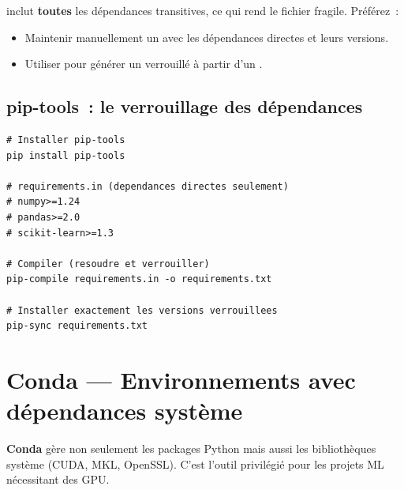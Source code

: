 \begin{attention}[title=\textbf{Pi\`eges de pip freeze}]
 inclut \textbf{toutes} les d\'ependances transitives, ce
qui rend le fichier fragile. Pr\'ef\'erez~:
\begin{itemize}
  \item Maintenir manuellement un  avec les
    d\'ependances directes et leurs versions.
  \item Utiliser  pour g\'en\'erer un 
    verrouill\'e \`a partir d'un .
\end{itemize}
\end{attention}

\subsection{pip-tools~: le verrouillage des d\'ependances}

\begin{codeblock}[title=\textbf{Workflow pip-tools}]
\begin{verbatim}
# Installer pip-tools
pip install pip-tools

# requirements.in (dependances directes seulement)
# numpy>=1.24
# pandas>=2.0
# scikit-learn>=1.3

# Compiler (resoudre et verrouiller)
pip-compile requirements.in -o requirements.txt

# Installer exactement les versions verrouillees
pip-sync requirements.txt
\end{verbatim}
\end{codeblock}

\section{Conda --- Environnements avec d\'ependances syst\`eme}
\label{sec:conda}

\textbf{Conda} g\`ere non seulement les packages Python mais
aussi les biblioth\`eques syst\`eme (CUDA, MKL, OpenSSL). C'est l'outil
privil\'egi\'e pour les projets ML n\'ecessitant des GPU.

